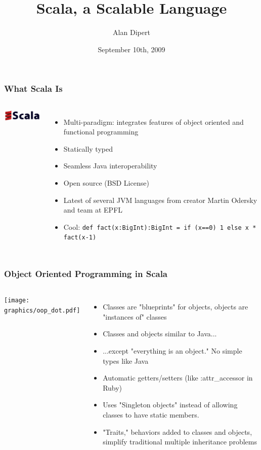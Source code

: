 \documentclass{beamer}
\title{Scala, a Scalable Language}
\author{Alan Dipert}
\date{September 10th, 2009}
\begin{document}
 
\maketitle 

\begin{frame} 
\frametitle{What Scala Is}
\begin{columns}[c]
  \column{0.5in}
    \includegraphics[width=1.0in]{graphics/scala_logo.png} 
  \column{2.5in}
    \begin{itemize}
      \item<1-> Multi-paradigm: integrates features of object oriented and functional programming
      \item<2-> Statically typed
      \item<3-> Seamless Java interoperability
      \item<4-> Open source (BSD License)
      \item<5-> Latest of several JVM languages from creator Martin Odersky and team at EPFL
      \item<6-> Cool: \tt{def fact(x:BigInt):BigInt = if (x==0) 1 else x * fact(x-1)}
    \end{itemize}
\end{columns}
\end{frame} 

\begin{frame} 
\frametitle{Object Oriented Programming in Scala}
\begin{columns}[c]
  \column{1.0in}
    \texttt{[image: graphics/oop\_dot.pdf]} 
  \column{2.0in}
    \begin{itemize}
      \item<1-> Classes are "blueprints" for objects, objects are "instances of" classes
      \item<2-> Classes and objects similar to Java...
      \item<3-> ...except "everything is an object."  No simple types like Java
      \item<4-> Automatic getters/setters (like :attr\_accessor in Ruby)
      \item<5-> Uses "Singleton objects" instead of allowing classes to have static members.
      \item<6-> "Traits," behaviors added to classes and objects, simplify traditional multiple inheritance problems
    \end{itemize}
\end{columns}
\end{frame} 
\end{document}

